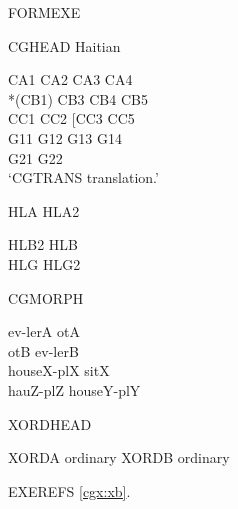 \noindent FORMEXE

\begin{exe}
\ex CGHEAD Haitian
\begin{xlist}[CommonGloss]
\ex \ok CA1 CA2 CA3 CA4 {} \\
\ex\label{cgx:xb} *(CB1) {} CB3 CB4 CB5\\
\ex[?] CC1 CC2 [CC3 {} CC5\\
\CommonGloss G11 G12 G13 G14\\
\CommonGloss G21 G22\\
\glt `CGTRANS translation.'
\end{xlist}

\ex
\begin{xlist}[CommonGloss]
\item HLA HLA2\\
\item HLB2 HLB\\
\CommonGloss HLG HLG2\\
\end{xlist}

\ex CGMORPH
\begin{xlist}[CommonGloss]
\ex ev-lerA otA\\
\ex otB ev-lerB\\
\CommonGloss houseX-plX sitX\\
\CommonGloss hauZ-plZ houseY-plY\\
\end{xlist}

\ex XORDHEAD
\begin{xlist}
\ex XORDA ordinary
\ex XORDB ordinary
\end{xlist}
\end{exe}

\noindent EXEREFS \ref{cgx:xb}.

